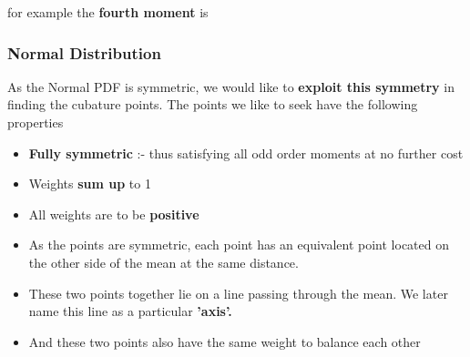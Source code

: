 \documentclass{beamer}
\begin{document}
\begin{frame}
 for example the {\bf fourth moment} is
\end{frame}
\begin{frame}
\frametitle{Normal Distribution}
As the Normal PDF is symmetric, we would like to {\bf exploit this symmetry} in finding the cubature points. The points we like to seek have the following properties 
\begin{itemize}[<+->]
\item {\bf Fully symmetric} :- thus satisfying all odd order moments at no further cost
\item Weights {\bf sum up} to 1
\item All weights are to be {\bf positive}
\item As the points are symmetric, each point has an equivalent point located on the other side of the mean at the same distance.
\item These two points together lie on a line passing through the mean. We later name this line as  a particular {\bf 'axis'.} 
\item And these two points also have the same weight to balance each other
\end{itemize}
\end{frame}
\end{document}
